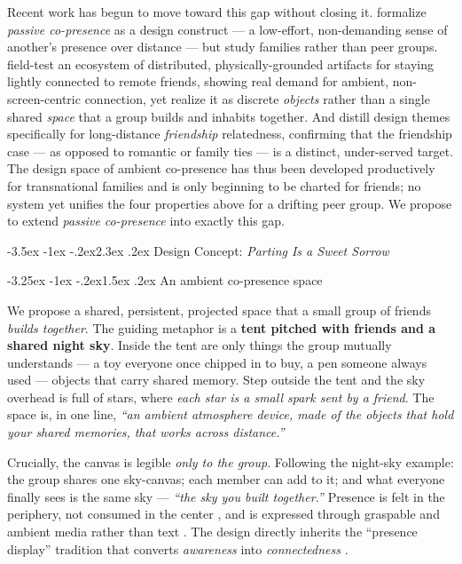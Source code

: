 \documentclass[11pt]{article}
\makeatletter
\renewcommand\section{\@startsection{section}{1}{\z@}%
  {-3.5ex \@plus -1ex \@minus -.2ex}{2.3ex \@plus .2ex}%
  {\normalfont\Large\bfseries\color{accent}}}
\renewcommand\subsection{\@startsection{subsection}{2}{\z@}%
  {-3.25ex \@plus -1ex \@minus -.2ex}{1.5ex \@plus .2ex}%
  {\normalfont\large\bfseries\color{accent}}}
\makeatother
\begin{document}
Recent work has begun to move toward this gap without closing it.
\citet{shakeri2024} formalize \emph{passive co-presence} as a design construct
--- a low-effort, non-demanding sense of another's presence over distance ---
but study families rather than peer groups. \citet{leong2023} field-test an
ecosystem of distributed, physically-grounded artifacts for staying lightly
connected to remote friends, showing real demand for ambient, non-screen-centric
connection, yet realize it as discrete \emph{objects} rather than a single shared
\emph{space} that a group builds and inhabits together. And \citet{huschke2025}
distill design themes specifically for long-distance \emph{friendship}
relatedness, confirming that the friendship case --- as opposed to romantic or
family ties --- is a distinct, under-served target. The design space of ambient
co-presence has thus been developed productively for transnational families
\citep{madianou2016} and is only beginning to be charted for friends; no system
yet unifies the four properties above for a drifting peer group. We propose to
extend \emph{passive co-presence} \citep{shakeri2024} into exactly this gap.

\section{Design Concept: \textit{Parting Is a Sweet Sorrow}}

\subsection{An ambient co-presence space}

We propose a shared, persistent, projected space that a small group of friends
\emph{builds together}. The guiding metaphor is a \textbf{tent pitched with
friends and a shared night sky}. Inside the tent are only things the group
mutually understands --- a toy everyone once chipped in to buy, a pen someone
always used --- objects that carry shared memory. Step outside the tent and the
sky overhead is full of stars, where \emph{each star is a small spark sent by a
friend}. The space is, in one line, \emph{``an ambient atmosphere device, made
of the objects that hold your shared memories, that works across distance.''}

Crucially, the canvas is legible \emph{only to the group}. Following the
night-sky example: the group shares one sky-canvas; each member can add to it;
and what everyone finally sees is the same sky --- \emph{``the sky you built
together.''} Presence is felt in the periphery, not consumed in the center
\citep{weiserbrown1996}, and is expressed through graspable and ambient media
rather than text \citep{ishiiullmer1997}. The design directly inherits the
``presence display'' tradition that converts \emph{awareness} into
\emph{connectedness} \citep{deyguzman2006, markopoulos2004}.
\end{document}
